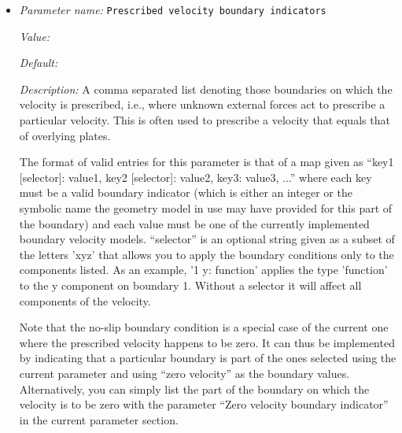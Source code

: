 \begin{itemize}
The format of valid entries for this parameter is that of a map given as ``key1 [selector]: value1, key2 [selector]: value2, key3: value3, ...'' where each key must be a valid boundary indicator (which is either an integer or the symbolic name the geometry model in use may have provided for this part of the boundary) and each value must be one of the currently implemented boundary traction models. ``selector'' is an optional string given as a subset of the letters 'xyz' that allows you to apply the boundary conditions only to the components listed. As an example, '1 y: function' applies the type 'function' to the y component on boundary 1. Without a selector it will affect all components of the traction.


{\it Possible values:} [Map map of <[Anything]:[Selection function|zero traction ]> of length 0...4294967295 (inclusive)]
\item {\it Parameter name:} {\tt Prescribed velocity boundary indicators}
\label{parameters:Model settings/Prescribed velocity boundary indicators}


{\it Value:} 


{\it Default:} 


{\it Description:} A comma separated list denoting those boundaries on which the velocity is prescribed, i.e., where unknown external forces act to prescribe a particular velocity. This is often used to prescribe a velocity that equals that of overlying plates.

The format of valid entries for this parameter is that of a map given as ``key1 [selector]: value1, key2 [selector]: value2, key3: value3, ...'' where each key must be a valid boundary indicator (which is either an integer or the symbolic name the geometry model in use may have provided for this part of the boundary) and each value must be one of the currently implemented boundary velocity models. ``selector'' is an optional string given as a subset of the letters 'xyz' that allows you to apply the boundary conditions only to the components listed. As an example, '1 y: function' applies the type 'function' to the y component on boundary 1. Without a selector it will affect all components of the velocity.

Note that the no-slip boundary condition is a special case of the current one where the prescribed velocity happens to be zero. It can thus be implemented by indicating that a particular boundary is part of the ones selected using the current parameter and using ``zero velocity'' as the boundary values. Alternatively, you can simply list the part of the boundary on which the velocity is to be zero with the parameter ``Zero velocity boundary indicator'' in the current parameter section.


\end{itemize}
